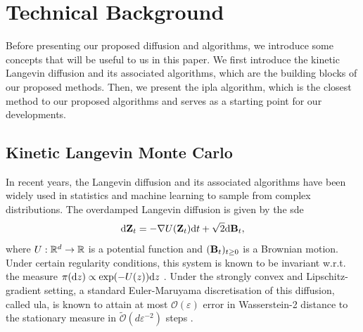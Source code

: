 \section{Technical Background}\label{sec:background}

Before presenting our proposed diffusion and algorithms, we introduce some concepts that will be useful to us in this paper. We first introduce the kinetic Langevin diffusion and its associated algorithms, which are the building blocks of our proposed methods. Then, we present the \gls*{ipla} algorithm, which is the closest method to our proposed algorithms and serves as a starting point for our developments.

\subsection{Kinetic Langevin Monte Carlo}
In recent years, the Langevin diffusion and its associated algorithms have been widely used in statistics and machine learning to sample from complex distributions. The overdamped Langevin diffusion is given by the \gls*{sde}
\begin{equation}\label{eq:LangevinDiffusion}
\mathrm{d}{\mathbf Z}_t = -\nabla U({\mathbf Z}_t) \mathrm{d}t + \sqrt{2}\mathrm{d}{\mathbf B}_t,
\end{equation}
where $U:{\mathbb R}^d \to {\mathbb R}$ is a potential function and $({\mathbf B}_t)_{t\geq 0}$ is a Brownian motion. Under certain regularity conditions, this system is known to be invariant w.r.t. the measure $\pi({\mathrm d} z) \propto \exp(-U(z)){\mathrm d} z$ \citep{Pavliotis_2014}. Under the strongly convex and Lipschitz-gradient setting, a standard Euler-Maruyama discretisation of this diffusion, called \gls*{ula}, is known to attain at most $\mathcal{O}(\varepsilon)$ error in Wasserstein-2 distance to the stationary measure in $\widetilde{\mathcal{O}}(d \varepsilon^{-2})$ steps \citep{dalalyan2017theoretical, durmus2019high}.

